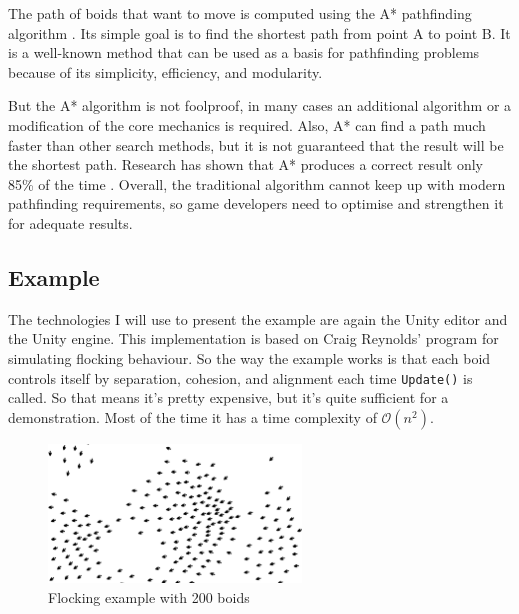 \documentclass[a4paper,12pt,openright]{book}
\begin{document}
The path of boids that want to move is computed using the A* pathfinding algorithm \cite{AStarHart1968}. Its simple goal is to find the shortest path from point A to point B. It is a well-known method that can be used as a basis for pathfinding problems because of its simplicity, efficiency, and modularity.

But the A* algorithm is not foolproof, in many cases an additional algorithm or a modification of the core mechanics is required. Also, A* can find a path much faster than other search methods, but it is not guaranteed that the result will be the shortest path. Research has shown that A* produces a correct result only 85\% of the time \cite{FOEAD2021507}. Overall, the traditional algorithm cannot keep up with modern pathfinding requirements, so game developers need to optimise and strengthen it for adequate results.

\clearpage

\subsection{Example}

The technologies I will use to present the example are again the Unity \cite{UnitySoftware}editor and the Unity engine. This implementation is based on Craig Reynolds' program \cite{FlocksReynolds} for simulating flocking behaviour. So the way the example works is that each boid controls itself by separation, cohesion, and alignment each time \texttt{Update()} is called. So that means it's pretty expensive, but it's quite sufficient for a demonstration. Most of the time it has a time complexity of $ \mathcal{O}(n^2) $.

\begin{figure}[h]
\begin{center}
\includegraphics[width=0.6\textwidth]{Images/FlockingExample.png}
\end{center}
\caption{Flocking example with 200 boids}
\label{100boids}
\end{figure}
\end{document}
